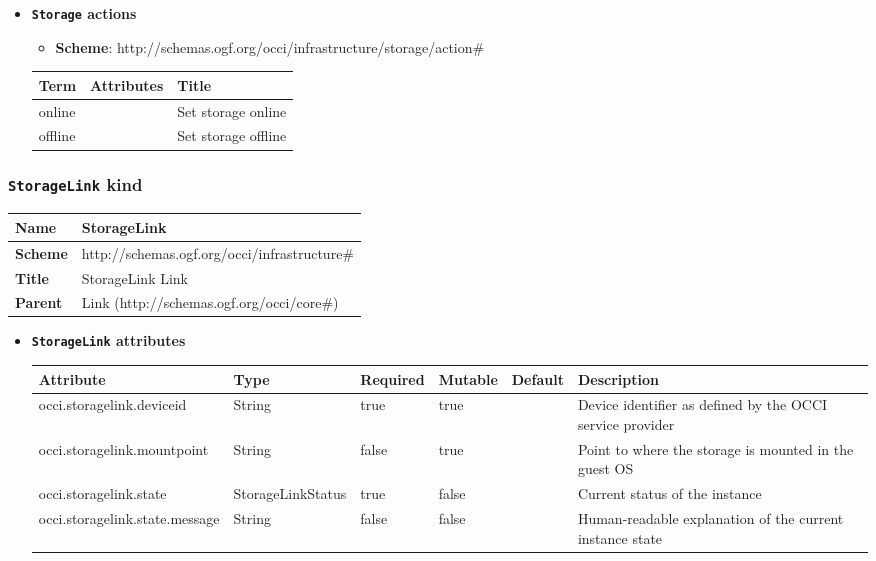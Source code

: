\begin{itemize}
\item \textbf{\texttt{Storage} actions}

\begin{itemize}
	\item \textbf{Scheme}: http://schemas.ogf.org/occi/infrastructure/storage/action\#
\end{itemize}
\begin{tabularx}{\textwidth}{|l|l|X|}
  \hline
  \textbf{Term}  & \textbf{Attributes} & \textbf{Title} \\
  \hline  
  online & & Set storage online \\
  \hline
  offline & & Set storage offline \\
  \hline
\end{tabularx}
\end{itemize}

\subsubsection{\texttt{StorageLink} kind}
\begin{center}
\begin{tabular}{|l|l|}
  \hline
  \textbf{Name} & StorageLink \\
  \hline  
  \textbf{Scheme} & http://schemas.ogf.org/occi/infrastructure\# \\
  \hline
  \textbf{Title} & StorageLink Link \\
  \hline
  \textbf{Parent} & Link (http://schemas.ogf.org/occi/core\#) \\
  \hline
\end{tabular}
\end{center}
\begin{itemize}
\item \textbf{\texttt{StorageLink} attributes}

\begin{tabularx}{\textwidth}{|l|l|p{1.4cm}|p{1.3cm}|l|X|}
  \hline
  \textbf{Attribute} & \textbf{Type} & \textbf{Required} & \textbf{Mutable} & \textbf{Default} & \textbf{Description} \\
  \hline  
  occi.storagelink.deviceid & String & true & true &  & Device identifier as defined by the OCCI service provider \\
  \hline
  occi.storagelink.mountpoint & String & false & true &  & Point to where the storage is mounted in the guest OS \\
  \hline
  occi.storagelink.state & StorageLinkStatus & true & false &  & Current status of the instance \\
  \hline
  occi.storagelink.state.message & String & false & false &  & Human-readable explanation of the current instance state \\
  \hline
\end{tabularx}
\end{itemize}


